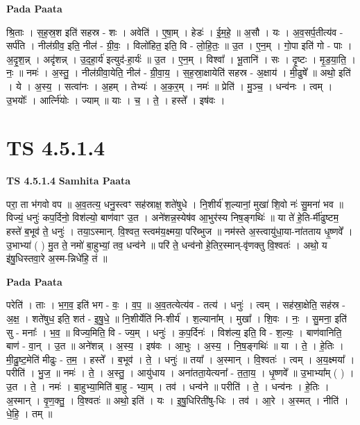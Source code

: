 \documentclass[17pt]{extarticle}
\begin{document}
\textbf{Pada Paata} \newline

श्रि॒ताः । स॒ह॒स्र॒श इति॑ सहस्र - शः । अवेति॑ । ए॒षा॒म् । हेडः॑ । ई॒म॒हे॒ ॥ अ॒सौ । यः । अ॒व॒सर्प॒तीत्य॑व - सर्प॑ति । नील॑ग्रीव॒ इति॒ नील॑ - ग्री॒वः॒ । विलो॑हित॒ इति॒ वि - लो॒हि॒तः॒ ॥ उ॒त । ए॒न॒म् । गो॒पा इति॑ गो - पाः । अ॒दृ॒श॒न्न् । अदृ॑शन्न् । उ॒द॒हा॒र्य॑ इत्युद॑-हा॒र्यः॑ ॥ उ॒त । ए॒न॒म् । विश्वा᳚ । भू॒तानि॑ । सः । दृ॒ष्टः । मृ॒ड॒या॒ति॒ । नः॒ ॥ नमः॑ । अ॒स्तु॒ । नील॑ग्रीवा॒येति॒ नील॑ - ग्री॒वा॒य॒ । स॒ह॒स्रा॒क्षायेति॑ सहस्र - अ॒क्षाय॑ । मी॒ढुषे᳚ ॥ अथो॒ इति॑ । ये । अ॒स्य॒ । सत्वा॑नः । अ॒हम् । तेभ्यः॑ । अ॒क॒र॒म् । नमः॑ ॥ प्रेति॑ । मु॒ञ्च॒ । धन्व॑नः । त्वम् । उ॒भयोः᳚ । आर्त्नि॑योः । ज्याम् ॥ याः । च॒ । ते॒ । हस्ते᳚ । इष॑वः ।  \newline





\section{ TS 4.5.1.4 }

\textbf{TS 4.5.1.4 } \newline
\textbf{Samhita Paata} \newline

परा॒ ता भ॑गवो वप ॥                                        अ॒व॒तत्य॒ धनु॒स्त्वꣳ सह॑स्राक्ष॒ शते॑षुधे । नि॒शीर्य॑ श॒ल्यानां॒ मुखा॑ शि॒वो नः॑ सु॒मना॑ भव ॥                          विज्यं॒ धनुः॑ कप॒र्दिनो॒ विश॑ल्यो॒ बाण॑वाꣳ उ॒त । अने॑शन्न॒स्येष॑व आ॒भुर॑स्य निष॒ङ्गथिः॑ ॥                                               या ते॑ हे॒ति-र्मी॑ढुष्टम॒ हस्ते॑ ब॒भूव॑ ते॒ धनुः॑ । तया॒ऽस्मान्. वि॒श्वत॒ स्त्वम॑य॒क्ष्मया॒ परि॑ब्भुज ॥                                  नम॑स्ते अ॒स्त्वायु॑धा॒या-ना॑तताय धृ॒ष्णवे᳚ । उ॒भाभ्या॑ ( ) मु॒त ते॒ नमो॑ बा॒हुभ्यां॒ तव॒ धन्व॑ने ॥                      परि॑ ते॒ धन्व॑नो हे॒तिर॒स्मान्-वृ॑णक्तु वि॒श्वतः॑ । अथो॒ य इ॑षु॒धिस्तवा॒रे अ॒स्म-न्निधे॑हि॒ तं ॥ \newline

\textbf{Pada Paata} \newline

परेति॑ । ताः । भ॒ग॒व॒ इति॑ भग - वः॒ । व॒प॒ ॥ अ॒व॒तत्येत्य॑व - तत्य॑ । धनुः॑ । त्वम् । सह॑स्रा॒क्षेति॒ सह॑स्र - अ॒क्ष॒ । शते॑षुध॒ इति॒ शत॑ - इ॒षु॒धे॒ ॥ नि॒शीर्येति॑ नि-शीर्य॑ । श॒ल्याना᳚म् । मुखा᳚ । शि॒वः । नः॒ । सु॒मना॒ इति॑ सु - मनाः᳚ । भ॒व॒ ॥ विज्य॒मिति॒ वि - ज्य॒म् । धनुः॑ । क॒प॒र्दिनः॑ । विश॑ल्य॒ इति॒ वि - श॒ल्यः॒ । बाण॑वानिति॒ बाण॑ - वा॒न् । उ॒त ॥ अने॑शन्न् । अ॒स्य॒ । इष॑वः । आ॒भुः । अ॒स्य॒ । नि॒ष॒ङ्गथिः॑ ॥ या । ते॒ । हे॒तिः । मी॒ढु॒ष्ट॒मेति॑ मीढुः - त॒म॒ । हस्ते᳚ । ब॒भूव॑ । ते॒ । धनुः॑ ॥ तया᳚ । अ॒स्मान् । वि॒श्वतः॑ । त्वम् । अ॒य॒क्ष्मया᳚ । परीति॑ । भु॒ज॒ ॥ नमः॑ । ते॒ । अ॒स्तु॒ । आयु॑धाय । अना॑तता॒येत्यना᳚ - त॒ता॒य॒ । धृ॒ष्णवे᳚ ॥ उ॒भाभ्या᳚म् ( ) । उ॒त । ते॒ । नमः॑ । बा॒हुभ्या॒मिति॑ बा॒हु - भ्या॒म् । तव॑ । धन्व॑ने ॥ परीति॑ । ते॒ । धन्व॑नः । हे॒तिः । अ॒स्मान् । वृ॒ण॒क्तु॒ । वि॒श्वतः॑ ॥ अथो॒ इति॑ । यः । इ॒षु॒धिरिती॑षु-धिः । तव॑ । आ॒रे । अ॒स्मत् । नीति॑ । धे॒हि॒ । तम् ॥  \newline
\end{document}
